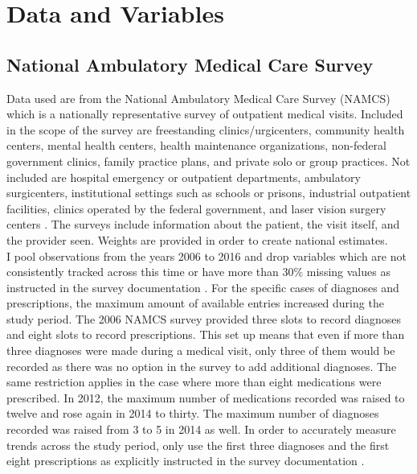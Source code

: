\chapter{Data and Variables}

\section{National Ambulatory Medical Care Survey}
Data used are from the National Ambulatory Medical Care Survey (NAMCS) which is a nationally representative survey of outpatient medical visits. Included in the scope of the survey are freestanding clinics/urgicenters, community health centers, mental health centers, health maintenance organizations,  non-federal government clinics, family practice plans, and private solo or group practices. Not included are hospital emergency or outpatient departments, ambulatory surgicenters, institutional settings such as schools or prisons, industrial outpatient facilities, clinics operated by the federal government, and laser vision surgery centers \cite{hing_basic_nodate}. The surveys include information about the patient, the visit itself, and the provider seen. Weights are provided in order to create national estimates.\\
\indent I pool observations from the years 2006 to 2016 and drop variables which are not consistently tracked across this time or have more than 30\% missing values as instructed in the survey documentation \cite{myrick_understanding_nodate}. For the specific cases of diagnoses and prescriptions, the maximum amount of available entries increased during the study period. The 2006 NAMCS survey provided three slots to record diagnoses and eight slots to record prescriptions. This set up means that even if more than three diagnoses were made during a medical visit, only three of them would be recorded as there was no option in the survey to add additional diagnoses. The same restriction applies in the case where more than eight medications were prescribed. In 2012, the maximum number of medications recorded was raised to twelve and rose again in 2014 to thirty. The maximum number of diagnoses recorded was raised from 3 to 5 in 2014 as well. In order to accurately measure trends across the study period, only use the first three diagnoses and the first eight prescriptions as explicitly instructed in the survey documentation \cite{schappert_analyzing_nodate}.\\

